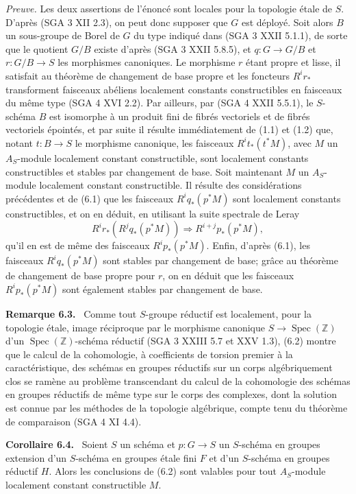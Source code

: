 \documentclass[11pt]{article}
\newenvironment{statement}[1]{\par\medskip\noindent\textbf{#1.}\ }{\par\medskip}
\begin{document}
\emph{Preuve.} Les deux assertions de l'énoncé sont locales pour la topologie étale de $S$. D'après (SGA 3 XII 2.3), on peut donc supposer que $G$ est déployé. Soit alors $B$ un sous-groupe de Borel de $G$ du type indiqué dans (SGA 3 XXII 5.1.1), de sorte que le quotient $G/B$ existe d'après (SGA 3 XXII 5.8.5), et $q:G\to G/B$ et $r:G/B\to S$ les morphismes canoniques. Le morphisme $r$ étant propre et lisse, il satisfait au théorème de changement de base propre et les foncteurs $R^ir_*$ transforment faisceaux abéliens localement constants constructibles en faisceaux du même type (SGA 4 XVI 2.2). Par ailleurs, par (SGA 4 XXII 5.5.1), le $S$-schéma $B$ est isomorphe à un produit fini de fibrés vectoriels et de fibrés vectoriels épointés, et par suite il résulte immédiatement de (1.1) et (1.2) que, notant $t:B\to S$ le morphisme canonique, les faisceaux $R^it_*(t^*M)$, avec $M$ un $A_S$-module localement constant constructible, sont localement constants constructibles et stables par changement de base. Soit maintenant $M$ un $A_S$-module localement constant constructible. Il résulte des considérations précédentes et de (6.1) que les faisceaux $R^iq_*(p^*M)$ sont localement constants constructibles, et on en déduit, en utilisant la suite spectrale de Leray
\[
R^ir_*(R^jq_*(p^*M))\Rightarrow R^{i+j}p_*(p^*M),
\]
qu'il en est de même des faisceaux $R^ip_*(p^*M)$. Enfin, d'après (6.1), les faisceaux $R^iq_*(p^*M)$ sont stables par changement de base; grâce au théorème de changement de base propre pour $r$, on en déduit que les faisceaux $R^ip_*(p^*M)$ sont également stables par changement de base.

\begin{statement}{Remarque 6.3}
Comme tout $S$-groupe réductif est localement, pour la topologie étale, image réciproque par le morphisme canonique $S\to\operatorname{Spec}(\mathbb Z)$ d'un $\operatorname{Spec}(\mathbb Z)$-schéma réductif (SGA 3 XXIII 5.7 et XXV 1.3), (6.2) montre que le calcul de la cohomologie, à coefficients de torsion premier à la caractéristique, des schémas en groupes réductifs sur un corps algébriquement clos se ramène au problème transcendant du calcul de la cohomologie des schémas en groupes réductifs de même type sur le corps des complexes, dont la solution est connue par les méthodes de la topologie algébrique, compte tenu du théorème de comparaison (SGA 4 XI 4.4).
\end{statement}

\begin{statement}{Corollaire 6.4}
Soient $S$ un schéma et $p:G\to S$ un $S$-schéma en groupes extension d'un $S$-schéma en groupes étale fini $F$ et d'un $S$-schéma en groupes réductif $H$. Alors les conclusions de (6.2) sont valables pour tout $A_S$-module localement constant constructible $M$.
\end{statement}
\end{document}
